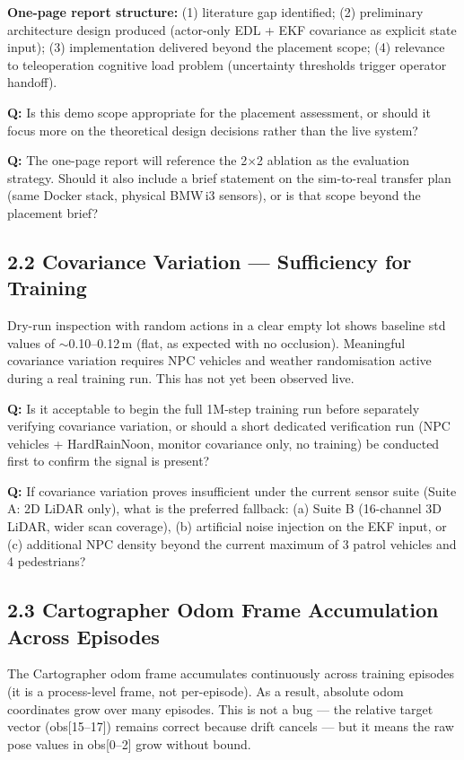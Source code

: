 \documentclass[11pt,a4paper]{article}
\newcommand{\question}[1]{\textcolor{question}{\textbf{Q:}} #1}
\begin{document}
\textbf{One-page report structure:}
(1) literature gap identified; (2) preliminary architecture design produced
(actor-only EDL + EKF covariance as explicit state input); (3) implementation
delivered beyond the placement scope; (4) relevance to teleoperation cognitive
load problem (uncertainty thresholds trigger operator handoff).

\question{Is this demo scope appropriate for the placement assessment, or should
it focus more on the theoretical design decisions rather than the live system?}

\question{The one-page report will reference the 2$\times$2 ablation as the
evaluation strategy. Should it also include a brief statement on the
sim-to-real transfer plan (same Docker stack, physical BMW\,i3 sensors), or
is that scope beyond the placement brief?}

\bigskip
\subsection*{2.2 Covariance Variation --- Sufficiency for Training}

Dry-run inspection with random actions in a clear empty lot shows baseline
std values of $\sim$0.10--0.12\,m (flat, as expected with no occlusion).
Meaningful covariance variation requires NPC vehicles and weather randomisation
active during a real training run. This has not yet been observed live.

\question{Is it acceptable to begin the full 1M-step training run before
separately verifying covariance variation, or should a short dedicated
verification run (NPC vehicles + HardRainNoon, monitor covariance only,
no training) be conducted first to confirm the signal is present?}

\question{If covariance variation proves insufficient under the current
sensor suite (Suite A: 2D LiDAR only), what is the preferred fallback:
(a) Suite B (16-channel 3D LiDAR, wider scan coverage), (b) artificial
noise injection on the EKF input, or (c) additional NPC density beyond the
current maximum of 3 patrol vehicles and 4 pedestrians?}

\bigskip
\subsection*{2.3 Cartographer Odom Frame Accumulation Across Episodes}

The Cartographer odom frame accumulates continuously across training episodes
(it is a process-level frame, not per-episode). As a result, absolute odom
coordinates grow over many episodes. This is not a bug --- the relative target
vector (obs[15--17]) remains correct because drift cancels --- but it means
the raw pose values in obs[0--2] grow without bound.
\end{document}
